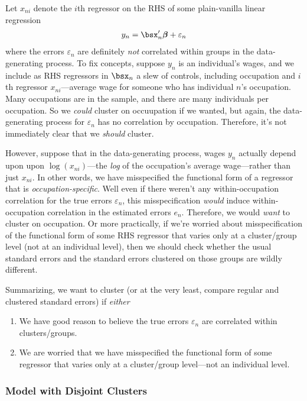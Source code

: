 \documentclass[12pt]{article}
\theoremstyle{plain}
\theoremstyle{definition}
\theoremstyle{remark}
\newcommand{\bsbeta}{\boldsymbol{\beta}}
\begin{document}
Let $x_{ni}$ denote the $i$th regressor on the RHS of some plain-vanilla
linear regression
\begin{align*}
  y_n = \bsx_n'\bsbeta + \varepsilon_n
\end{align*}
where the errors $\varepsilon_n$ are definitely \emph{not} correlated
within groups in the data-generating process. To fix concepts, suppose
$y_n$ is an individual's wages, and we include as RHS regressors
in $\bsx_n$ a slew of controls, including occupation and $i$th regressor
$x_{ni}$---average wage for someone who has individual $n$'s occupation.
Many occupations are in the sample, and there are many individuals per
occupation. So we \emph{could} cluster on occuupation if we wanted, but
again, the data-generating process for $\varepsilon_n$ has no
correlation by occupation. Therefore, it's not immediately clear that we
\emph{should} cluster.

However, suppose that in the data-generating process, wages $y_n$
actually depend upon upon $\log(x_{ni})$---the \emph{log} of the
occupation's average wage---rather than just $x_{ni}$. In other words,
we have misspecified the functional form of a regressor that is
\emph{occupation-specific}. Well even if there weren't any
within-occupation correlation for the true errors $\varepsilon_n$, this
misspecification \emph{would} induce within-occupation correlation in
the estimated errors $e_n$. Therefore, we would \emph{want} to cluster
on occupation.  Or more practically, if we're worried about
misspecification of the functional form of some RHS regressor that
varies only at a cluster/group level (not at an individual level), then
we should check whether the usual standard errors and the standard
errors clustered on those groups are wildly different.

Summarizing, we want to cluster (or at the very least, compare regular
and clustered standard errors) if \emph{either}
\begin{enumerate}
  \item We have good reason to believe the true errors $\varepsilon_n$
    are correlated within clusters/groups.
  \item We are worried that we have misspecified the functional form of
    some regressor that varies only at a cluster/group level---not an
    individual level.
\end{enumerate}

\subsubsection{Model with Disjoint Clusters}
\end{document}
